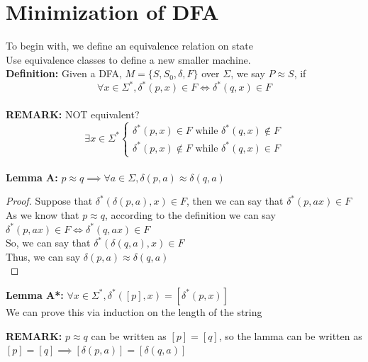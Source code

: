\documentclass [9 pt]{article}
\theoremstyle{definition}
\begin{document}
\section*{Minimization of DFA}
To begin with, we define an equivalence relation on state\\
Use equivalence classes to define a new smaller machine.\\
\newline
\textbf{Definition:} Given a DFA, $M =\{  S, S_0, \delta, F \} $ over $\Sigma$, we say $P \approx S$, if 
$$ \forall x \in \Sigma^*, \delta^*(p, x) \in F \Leftrightarrow \delta^*(q, x) \in F $$\\
\newline
\textbf{REMARK:} NOT equivalent?\\
$$ \exists x \in \Sigma^* \begin{cases}
	\delta^*(p, x) \in F \text{ while } \delta^*(q, x) \notin F\\
		\delta^*(p, x) \notin F \text{ while } \delta^*(q, x) \in F
\end{cases} $$
\\
\newline
\textbf{Lemma A:} $p \approx q \implies \forall a \in \Sigma, \delta(p, a)  \approx\delta(q, a)   $
\begin{proof}
	Suppose that $\delta^*(\delta( p, a ), x )\in F $, then we can say that $ \delta^*(p, ax ) \in F $ \\
	As we know that $p \approx q$, according to the definition we can say $ \delta^*(p, ax) \in F \Leftrightarrow \delta^*(q, ax) \in F  $\\
	So, we can say that $ \delta^*(\delta( q, a ), x )\in F  $\\
	Thus, we can say $\delta(p, a)  \approx \delta(q, a) $\\
\end{proof}
\textbf{Lemma A*:}
$\forall  x \in \Sigma^*, \delta^* ([p],x)=[\delta^*(p, x)]$\\
We can prove this via induction on the length of the string\\
\newline


\textbf{REMARK:} $p \approx q$ can be written as $[p] = [q]$, so the lamma can be written as $[p] = [q] \implies [\delta(p, a)]  = [\delta(q, a)] $ 
\end{document}
